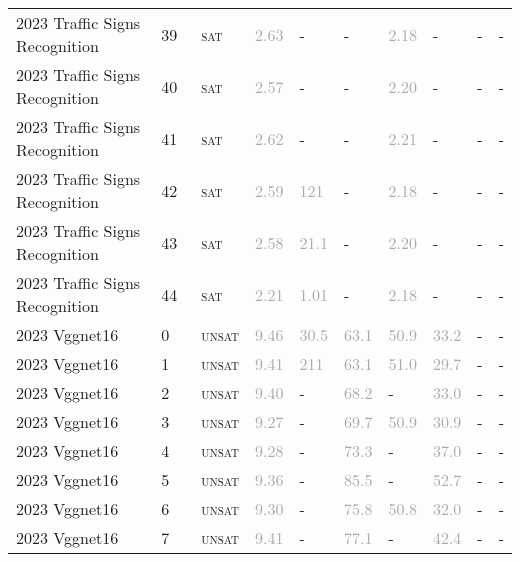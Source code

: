 \begin{center}
{\begin{longtable}{@{}llllllllll@{}}
2023 Traffic Signs Recognition & 39 & ~\textsc{sat} & \textcolor{darkgray}{2.63} & - & - & \textcolor{darkgray}{2.18} & - & - & - \\
2023 Traffic Signs Recognition & 40 & ~\textsc{sat} & \textcolor{darkgray}{2.57} & - & - & \textcolor{darkgray}{2.20} & - & - & - \\
2023 Traffic Signs Recognition & 41 & ~\textsc{sat} & \textcolor{darkgray}{2.62} & - & - & \textcolor{darkgray}{2.21} & - & - & - \\
2023 Traffic Signs Recognition & 42 & ~\textsc{sat} & \textcolor{darkgray}{2.59} & \textcolor{darkgray}{121} & - & \textcolor{darkgray}{2.18} & - & - & - \\
2023 Traffic Signs Recognition & 43 & ~\textsc{sat} & \textcolor{darkgray}{2.58} & \textcolor{darkgray}{21.1} & - & \textcolor{darkgray}{2.20} & - & - & - \\
2023 Traffic Signs Recognition & 44 & ~\textsc{sat} & \textcolor{darkgray}{2.21} & \textcolor{darkgray}{1.01} & - & \textcolor{darkgray}{2.18} & - & - & - \\
\midrule
2023 Vggnet16 & 0 & ~\textsc{unsat} & \textcolor{darkgray}{9.46} & \textcolor{darkgray}{30.5} & \textcolor{darkgray}{63.1} & \textcolor{darkgray}{50.9} & \textcolor{darkgray}{33.2} & - & - \\
2023 Vggnet16 & 1 & ~\textsc{unsat} & \textcolor{darkgray}{9.41} & \textcolor{darkgray}{211} & \textcolor{darkgray}{63.1} & \textcolor{darkgray}{51.0} & \textcolor{darkgray}{29.7} & - & - \\
2023 Vggnet16 & 2 & ~\textsc{unsat} & \textcolor{darkgray}{9.40} & - & \textcolor{darkgray}{68.2} & - & \textcolor{darkgray}{33.0} & - & - \\
2023 Vggnet16 & 3 & ~\textsc{unsat} & \textcolor{darkgray}{9.27} & - & \textcolor{darkgray}{69.7} & \textcolor{darkgray}{50.9} & \textcolor{darkgray}{30.9} & - & - \\
2023 Vggnet16 & 4 & ~\textsc{unsat} & \textcolor{darkgray}{9.28} & - & \textcolor{darkgray}{73.3} & - & \textcolor{darkgray}{37.0} & - & - \\
2023 Vggnet16 & 5 & ~\textsc{unsat} & \textcolor{darkgray}{9.36} & - & \textcolor{darkgray}{85.5} & - & \textcolor{darkgray}{52.7} & - & - \\
2023 Vggnet16 & 6 & ~\textsc{unsat} & \textcolor{darkgray}{9.30} & - & \textcolor{darkgray}{75.8} & \textcolor{darkgray}{50.8} & \textcolor{darkgray}{32.0} & - & - \\
2023 Vggnet16 & 7 & ~\textsc{unsat} & \textcolor{darkgray}{9.41} & - & \textcolor{darkgray}{77.1} & - & \textcolor{darkgray}{42.4} & - & - \\

\end{longtable}}
\end{center}
